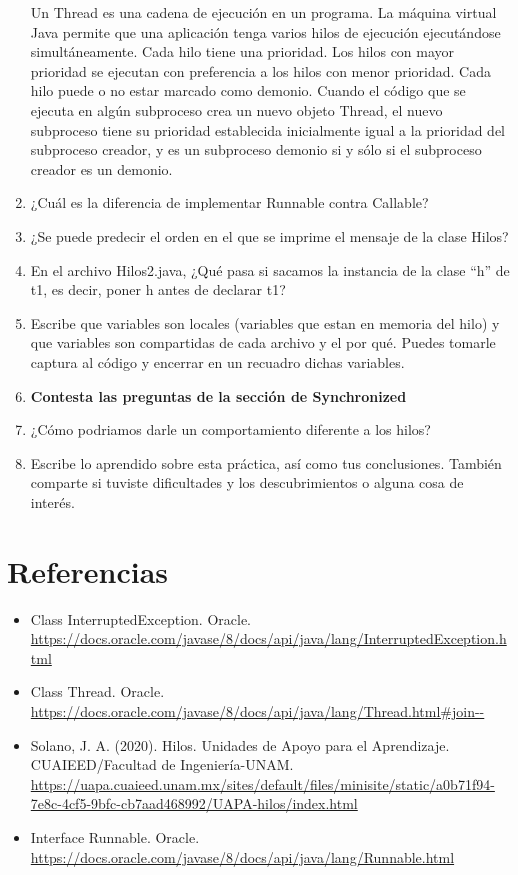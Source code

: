 \documentclass{article}
\begin{document}
\begin{enumerate}
    Un Thread es una cadena de ejecución en un programa. La máquina virtual Java permite que una aplicación tenga varios hilos de ejecución ejecutándose simultáneamente.
    Cada hilo tiene una prioridad. Los hilos con mayor prioridad se ejecutan con preferencia a los hilos con menor prioridad. Cada hilo puede o no estar marcado como demonio. Cuando el código que se ejecuta en algún subproceso crea un nuevo objeto Thread, el nuevo subproceso tiene su prioridad establecida inicialmente igual a la prioridad del subproceso creador, y es un subproceso demonio si y sólo si el subproceso creador es un demonio.
    
    \item ¿Cuál es la diferencia de implementar Runnable contra Callable?
    
    \item ¿Se puede predecir el orden en el que se imprime el mensaje de la clase Hilos?
    
    \item En el archivo Hilos2.java, ¿Qué pasa si sacamos la instancia de la clase “h” de t1, es decir, poner h antes de declarar t1?
    
    \item Escribe que variables son locales (variables que estan en memoria del hilo) y que variables son compartidas de cada archivo y el por qué. Puedes tomarle captura al código y encerrar en un recuadro dichas variables.
    
    \item \textbf{Contesta las preguntas de la sección de Synchronized}
    \item ¿Cómo podriamos darle un comportamiento diferente a los hilos?
    \item Escribe lo aprendido sobre esta práctica, así como tus conclusiones. También comparte si tuviste dificultades y los descubrimientos o alguna cosa de interés.
\end{enumerate}

\section{Referencias}
\begin{itemize}
    \item Class InterruptedException. Oracle. \url{https://docs.oracle.com/javase/8/docs/api/java/lang/InterruptedException.html}
    \item Class Thread. Oracle. \url{https://docs.oracle.com/javase/8/docs/api/java/lang/Thread.html#join--}
    \item Solano, J. A. (2020). Hilos. Unidades de Apoyo para el Aprendizaje. CUAIEED/Facultad de Ingeniería-UNAM. \url{https://uapa.cuaieed.unam.mx/sites/default/files/minisite/static/a0b71f94-7e8c-4cf5-9bfc-cb7aad468992/UAPA-hilos/index.html}
    \item Interface Runnable. Oracle. \url{https://docs.oracle.com/javase/8/docs/api/java/lang/Runnable.html}
\end{itemize}
\end{document}

